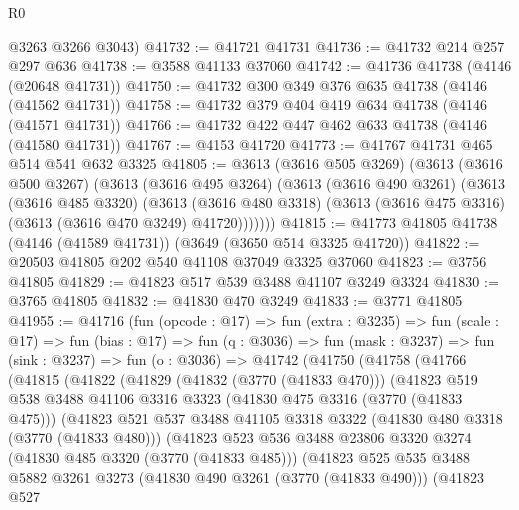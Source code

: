 \begin{lexlean}{R0}
\begin{coremodule}
      @3263
      @3266
      @3043)
@41732 := @41721 @41731
@41736 := @41732 @214 @257 @297 @636
@41738 := @3588 @41133 @37060
@41742 := @41736 @41738 (@4146 (@20648 @41731))
@41750 := @41732 @300 @349 @376 @635 @41738 (@4146 (@41562 @41731))
@41758 := @41732 @379 @404 @419 @634 @41738 (@4146 (@41571 @41731))
@41766 := @41732 @422 @447 @462 @633 @41738 (@4146 (@41580 @41731))
@41767 := @4153 @41720
@41773 := @41767 @41731 @465 @514 @541 @632 @3325
@41805 := @3613
    (@3616 @505 @3269)
    (@3613
      (@3616 @500 @3267)
      (@3613
        (@3616 @495 @3264)
        (@3613
          (@3616 @490 @3261)
          (@3613
            (@3616 @485 @3320)
            (@3613
              (@3616 @480 @3318)
              (@3613 (@3616 @475 @3316) (@3613 (@3616 @470 @3249) @41720)))))))
@41815 := @41773 @41805 @41738 (@4146 (@41589 @41731)) (@3649 (@3650 @514 @3325 @41720))
@41822 := @20503 @41805 @202 @540 @41108 @37049 @3325 @37060
@41823 := @3756 @41805
@41829 := @41823 @517 @539 @3488 @41107 @3249 @3324
@41830 := @3765 @41805
@41832 := @41830 @470 @3249
@41833 := @3771 @41805
@41955 := @41716
    (fun (opcode : @17) =>
    fun (extra : @3235) =>
    fun (scale : @17) =>
    fun (bias : @17) =>
    fun (q : @3036) =>
    fun (mask : @3237) =>
    fun (sink : @3237) =>
    fun (o : @3036) =>
    @41742
      (@41750
        (@41758
          (@41766
            (@41815
              (@41822
                (@41829
                  (@41832 (@3770 (@41833 @470)))
                  (@41823
                    @519
                    @538
                    @3488
                    @41106
                    @3316
                    @3323
                    (@41830 @475 @3316 (@3770 (@41833 @475)))
                    (@41823
                      @521
                      @537
                      @3488
                      @41105
                      @3318
                      @3322
                      (@41830 @480 @3318 (@3770 (@41833 @480)))
                      (@41823
                        @523
                        @536
                        @3488
                        @23806
                        @3320
                        @3274
                        (@41830 @485 @3320 (@3770 (@41833 @485)))
                        (@41823
                          @525
                          @535
                          @3488
                          @5882
                          @3261
                          @3273
                          (@41830 @490 @3261 (@3770 (@41833 @490)))
                          (@41823
                            @527

\end{coremodule}
\end{lexlean}
